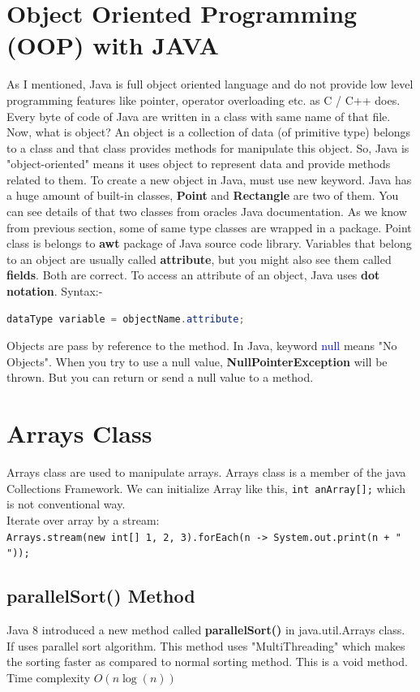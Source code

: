 \section{Object Oriented Programming (OOP) with \textbf{JAVA}}
As I mentioned, Java is full object oriented language and do not provide low level programming features like pointer, operator overloading etc. as C / C++ does. Every byte of code of Java are written in a class with same name of that file. Now, what is object? An object is a collection of data (of primitive type) belongs to a class and that class provides methods for manipulate this object. So, Java is "object-oriented" means it uses object to represent data and provide methods related to them. To create a new object in Java, must use new keyword. Java has a huge amount of built-in classes, \textbf{Point} and \textbf{Rectangle} are two of them. You can see details of that two classes from oracles Java documentation. As we know from previous section, some of same type classes are wrapped in a package. Point class is belongs to \textbf{awt} package of Java source code library. Variables that belong to an object are usually called \textbf{attribute}, but you might also see them called \textbf{fields}. Both are correct. To access an attribute of an object, Java uses \textbf{dot notation}. Syntax:- \\
\begin{lstlisting}[language = java]
	dataType variable = objectName.attribute;
\end{lstlisting}
Objects are pass by reference to the method. In Java, keyword \textcolor{blue}{null} means "No Objects". When you try to use a null value, \textbf{NullPointerException} will be thrown. But you can return or send a null value to a method.

\section{Arrays Class}
Arrays class are used to manipulate arrays. Arrays class is a member of the java Collections Framework. We can initialize Array like this, \texttt{int anArray[];} which is not conventional way.\\
Iterate over array by a stream:\\
\texttt{\footnotesize Arrays.stream(new int[] {1, 2, 3}).forEach(n -> System.out.print(n + " "));}
\subsection{parallelSort() Method}
Java 8 introduced a new method called \textbf{parallelSort()} in java.util.Arrays class. If uses parallel sort algorithm. This method uses "MultiThreading" which makes the sorting faster as compared to normal sorting method. This is a void method. Time complexity $O(n\log(n))$
